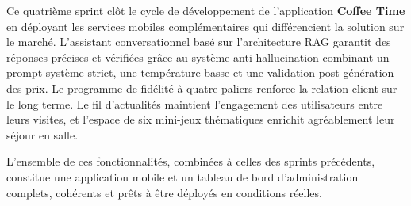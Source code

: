 Ce quatrième sprint clôt le cycle de développement de l'application
\textbf{Coffee Time} en déployant les services mobiles complémentaires qui
différencient la solution sur le marché. L'assistant conversationnel basé sur
l'architecture RAG garantit des réponses précises et vérifiées grâce au système
anti-hallucination combinant un prompt système strict, une température basse et
une validation post-génération des prix. Le programme de fidélité à quatre paliers
renforce la relation client sur le long terme. Le fil d'actualités maintient
l'engagement des utilisateurs entre leurs visites, et l'espace de six mini-jeux
thématiques enrichit agréablement leur séjour en salle.

L'ensemble de ces fonctionnalités, combinées à celles des sprints précédents,
constitue une application mobile et un tableau de bord d'administration complets,
cohérents et prêts à être déployés en conditions réelles.
